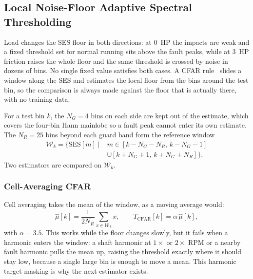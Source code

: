 \subsection{Local Noise-Floor Adaptive Spectral Thresholding}
Load changes the SES floor in both directions: at $0$~HP the impacts are weak
and a fixed threshold set for normal running sits above the fault peaks, while
at $3$~HP friction raises the whole floor and the same threshold is crossed by
noise in dozens of bins. No single fixed value satisfies both cases. A CFAR
rule~\cite{richards} slides a window along the SES and estimates the local floor
from the bins around the test bin, so the comparison is always made against the
floor that is actually there, with no training data.

For a test bin $k$, the $N_G=4$ bins on each side are kept out of the estimate,
which covers the four-bin Hann mainlobe so a fault peak cannot enter its own
estimate. The $N_R=25$ bins beyond each guard band form the reference window
\begin{equation}
\begin{aligned}
  \mathcal{W}_k=\big\{\text{SES}[m]\;\big|\;&
  m\in[k-N_G-N_R,\,k-N_G-1]\\
  &\cup[k+N_G+1,\,k+N_G+N_R]\big\}.
\end{aligned}
  \label{eq:window}
\end{equation}
Two estimators are compared on $\mathcal{W}_k$.

\subsubsection{Cell-Averaging CFAR}
Cell averaging takes the mean of the window, as a moving average would:
\begin{equation}
  \hat{\mu}[k]=\frac{1}{2N_R}\sum_{x\in\mathcal{W}_k}x,
  \qquad T_{\text{CFAR}}[k]=\alpha\,\hat{\mu}[k],
  \label{eq:cacfar}
\end{equation}
with $\alpha=3.5$. This works while the floor changes slowly, but it fails when
a harmonic enters the window: a shaft harmonic at $1\times$ or $2\times$ RPM or a
nearby fault harmonic pulls the mean up, raising the threshold exactly where it
should stay low, because a single large bin is enough to move a mean. This
harmonic target masking is why the next estimator exists.

